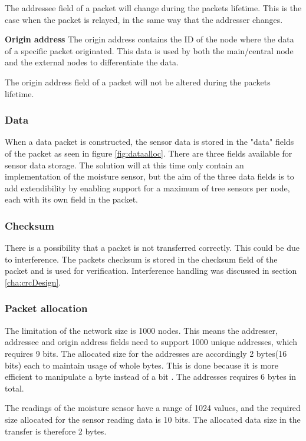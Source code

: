 The addressee field of a packet will change during the packets lifetime. This is the case when the packet is relayed, in the same way that the addresser changes.

\textbf{Origin address}\newline
The origin address contains the ID of the node where the data of a specific packet originated. This data is used by both the main/central node and the external nodes to differentiate the data.

The origin address field of a packet will not be altered during the packets lifetime.


\subsubsection{Data}
When a data packet is constructed, the sensor data is stored in the "data" fields of the packet as seen in figure \ref{fig:dataalloc}. There are three fields available for sensor data storage. The solution will at this time only contain an implementation of the moisture sensor, but the aim of the three data fields is to add extendibility by enabling support for a maximum of tree sensors per node, each with its own field in the packet.


\subsubsection{Checksum}
There is a possibility that a packet is not transferred correctly. This could be due to interference. The packets checksum is stored in the checksum field of the packet and is used for verification. Interference handling was discussed in section \ref{cha:crcDesign}.


\subsubsection{Packet allocation}
The limitation of the network size is 1000 nodes. This means the addresser, addressee and origin address fields need to support 1000 unique addresses, which requires 9 bits. The allocated size for the addresses are accordingly 2 bytes(16 bits) each to maintain usage of whole bytes. This is done because it is more efficient to manipulate a byte instead of a bit \cite{bytevsbit}. The addresses requires 6 bytes in total.

The readings of the moisture sensor have a range of 1024 values, and the required size allocated for the sensor reading data is 10 bits. The allocated data size in the transfer is therefore 2 bytes.

